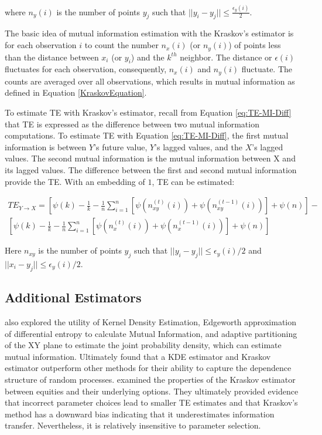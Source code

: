 \noindent where \(n_y(i)\) is the number of points \(y_j\) such that \(|| y_i - y_j || \leq \frac{\epsilon_y(i)}{2} \).

The basic idea of mutual information estimation with the Kraskov's estimator is for each observation \(i\) to count the number \(n_x(i)\) (or \(n_y(i)\)) of points less than the distance between \(x_i\) (or \(y_i\)) and the \(k^{th}\) neighbor. The distance or \(\epsilon(i)\) fluctuates for each observation, consequently, \(n_x(i)\) and \(n_y(i)\) fluctuate. The counts are averaged over all observations, which results in mutual information as defined in Equation \ref{KraskovEquation}.


To estimate TE with Kraskov's estimator, recall from Equation \ref{eq:TE-MI-Diff} that TE is expressed as the difference between two mutual information computations. To estimate TE with Equation \ref{eq:TE-MI-Diff}, the first mutual information is between \(Y\)'s future value, \(Y\)'s lagged values, and the  \(X\)'s lagged values. The second mutual information is the mutual information between X and its lagged values. The difference between the first and second mutual information provide the TE. With an embedding of \(1\), TE can be estimated: 

\setlength{\arraycolsep}{0.0em}
\begin{eqnarray}
TE_{Y \rightarrow X} =  \left[  \psi(k) - \frac{1}{k} - \frac{1}{n}  \sum_{i=1}^n [ \psi(n_{xy}^{(t)}(i)) + \psi(n_{xy}^{(t-1)}(i) ) ] + \psi(n) \right]   -  \nonumber\\
\left[  \psi(k) - \frac{1}{k} - \frac{1}{n}  \sum_{i=1}^n [ \psi(n_{x}^{(t)}(i)) + \psi(n_{x}^{(t-1)}(i) ) ] + \psi(n) \right]
\label{eq:TE-EST}
\end{eqnarray}
\setlength{\arraycolsep}{1pt}

\noindent  Here \(n_{xy}\) is the number of points \(y_j\) such that \(||y_i - y_j  || \leq \epsilon_y(i)/2\) and \(||x_i - y_j  || \leq \epsilon_y(i)/2\).

\subsection{Additional Estimators}
\cite{EstimatingTE} also explored the utility of Kernel Density Estimation, Edgeworth approximation of differential entropy to calculate Mutual Information, and adaptive partitioning of the XY plane to estimate the joint probability density, which can estimate mutual information. Ultimately \cite{EstimatingTE} found that a KDE estimator and Kraskov estimator outperform other methods for their ability to capture the dependence structure of random processes. \cite{JeffTE} examined the properties of the Kraskov estimator between equities and their underlying options. They ultimately provided evidence that incorrect parameter choices lead to smaller TE estimates and that Kraskov's method has a downward bias indicating that it underestimates information transfer. Nevertheless, it is relatively insensitive to parameter selection. 


